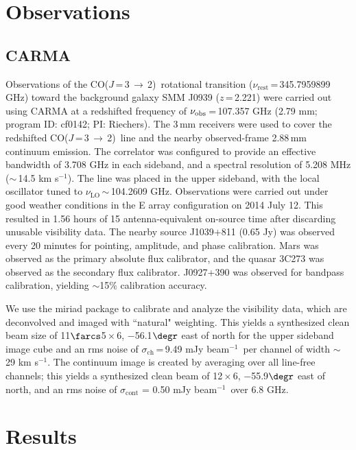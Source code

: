 \documentclass[iop]{emulateapj}
\newcommand{\CO}{\mbox{CO($J$\,=\,3\,$\rightarrow$\,2) }}
\newcommand{\pmOne}{\mbox{$^{-1}$}}
\begin{document}
\section{Observations}\label{sec:obs}
\subsection{CARMA} \label{sec:carmadata}
Observations of the \CO rotational transition ($\nu_\textrm{rest}$\,=\,345.7959899 GHz) toward the background galaxy SMM
J0939 ($z$\,=\,2.221) were carried out using CARMA at a redshifted frequency of $\nu_{\rm obs}$\,=\,107.357\,\,GHz (2.79\,\,mm; program ID: cf0142; PI: Riechers). The 3\,mm receivers were used to cover the redshifted \CO line and the nearby observed-frame 2.88\,mm continuum emission. The correlator was configured to provide an effective bandwidth of 3.708 GHz in each sideband, and a spectral resolution of 5.208 MHz ($\sim$\,14.5 km\,\,s\pmOne). 
The line was placed in the
upper sideband, with the local oscillator tuned to $\nu_\textrm{LO}$\,$\sim$\,104.2609 GHz.
Observations were carried out under good
weather conditions in the E array configuration on 2014 July 12. This resulted in 1.56 hours of 15 antenna-equivalent on-source time after discarding unusable visibility data.
The nearby source J1039+811 (0.65\,\,Jy) was observed every 20 minutes for
pointing, amplitude, and phase calibration. Mars was observed as the primary
absolute flux calibrator, and the quasar 3C273 was observed as the secondary
flux calibrator. J0927+390 was observed for bandpass calibration, yielding $\sim
$15\% calibration accuracy. \par
We use the {\sc miriad} package to calibrate and analyze the visibility data, which are deconvolved and imaged with ``natural" weighting.
This yields a synthesized clean beam size of 11$\farcs$5\,$\times$\,6, $-$56.1$\degr$ east of north for the upper sideband image cube and an rms noise of $\sigma_\textrm{ch}$\,=\,9.49\,\,mJy\,\,beam\pmOne\ per channel
of width $\sim$\,29 km\,\,s\pmOne.
The continuum image is created by
averaging over all line-free channels; this yields a synthesized clean beam of 12\,$\times$\,6, $-$55.9$\degr$ east of north, and an rms noise of $\sigma_\textrm{cont}$ = 0.50\,\,mJy\,\,beam\pmOne\ over 6.8 GHz.

\section{Results}\label{sec:res}
\end{document}
